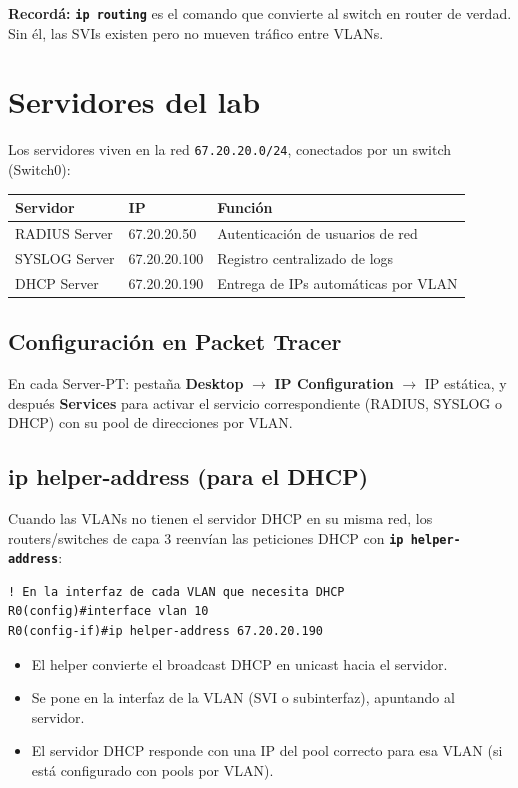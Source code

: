 \documentclass[11pt,a4paper]{report}
\newcommand{\cmd}[1]{\texttt{\textbf{#1}}}
\begin{document}
\textbf{Recordá:} \cmd{ip routing} es el comando que convierte al switch en router de verdad. Sin él, las SVIs existen pero no mueven tráfico entre VLANs.

\chapter{Servidores del lab}

Los servidores viven en la red \texttt{67.20.20.0/24}, conectados por un switch (Switch0):

\begin{longtable}{@{}p{5cm}p{4cm}p{6.5cm}@{}}
\toprule
\textbf{Servidor} & \textbf{IP} & \textbf{Función} \\
\midrule
\endhead
RADIUS Server & 67.20.20.50 & Autenticación de usuarios de red \\
\addlinespace
SYSLOG Server & 67.20.20.100 & Registro centralizado de logs \\
\addlinespace
DHCP Server & 67.20.20.190 & Entrega de IPs automáticas por VLAN \\
\bottomrule
\end{longtable}

\section{Configuración en Packet Tracer}

En cada Server-PT: pestaña \textbf{Desktop} $\rightarrow$ \textbf{IP Configuration} $\rightarrow$ IP estática, y después \textbf{Services} para activar el servicio correspondiente (RADIUS, SYSLOG o DHCP) con su pool de direcciones por VLAN.

\section{ip helper-address (para el DHCP)}

Cuando las VLANs no tienen el servidor DHCP en su misma red, los routers/switches de capa 3 reenvían las peticiones DHCP con \cmd{ip helper-address}:

\begin{lstlisting}
! En la interfaz de cada VLAN que necesita DHCP
R0(config)#interface vlan 10
R0(config-if)#ip helper-address 67.20.20.190
\end{lstlisting}

\begin{itemize}
  \item El helper convierte el broadcast DHCP en unicast hacia el servidor.
  \item Se pone en la interfaz de la VLAN (SVI o subinterfaz), apuntando al servidor.
  \item El servidor DHCP responde con una IP del pool correcto para esa VLAN (si está configurado con pools por VLAN).
\end{itemize}
\end{document}
